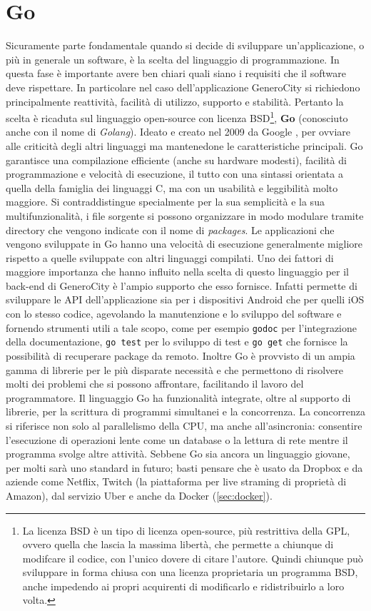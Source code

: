 \documentclass[italian, Lau, oneside, nodefaultfont, noexaminfo]{sapthesis}
\begin{document}
\section{Go}
Sicuramente parte fondamentale quando si decide di sviluppare un'applicazione, o pi\`u in generale un software, \`e la scelta del linguaggio di programmazione. In questa fase \`e importante avere ben chiari quali siano i requisiti che il software deve rispettare. In  particolare nel caso dell'applicazione GeneroCity si richiedono principalmente reattività, facilit\`a di utilizzo, supporto e stabilit\`a. Pertanto la scelta \`e ricaduta sul linguaggio  open-source con licenza BSD\footnote{ La licenza BSD \`e un tipo di licenza open-source, pi\`u restrittiva della GPL, ovvero quella che lascia la massima libert\`a, che permette a chiunque di modifcare il codice, con l'unico dovere di citare l'autore. Quindi chiunque pu\`o sviluppare in forma chiusa con una licenza proprietaria un programma BSD, anche impedendo ai propri acquirenti di modificarlo e ridistribuirlo a loro volta.}, \textbf{Go} (conosciuto anche con il nome di \textit{Golang}). Ideato e  creato nel 2009 da Google \cite{ref:Golang}, per ovviare alle criticit\`a degli altri linguaggi ma mantenedone le caratteristiche principali. Go garantisce una compilazione efficiente (anche su hardware modesti),  facilit\`a di programmazione e velocit\`a di esecuzione, il tutto con una sintassi orientata a quella della famiglia dei linguaggi C, ma con un usabilit\`a e leggibilit\`a molto maggiore. Si contraddistingue specialmente per la sua semplicit\`a e la sua multifunzionalit\`a, i file sorgente si possono organizzare in modo modulare tramite directory che vengono indicate con il nome di \textit{packages}. 
Le applicazioni che vengono sviluppate in Go hanno una velocit\`a di esecuzione generalmente migliore rispetto a quelle sviluppate con altri linguaggi compilati.
Uno dei fattori di maggiore importanza che hanno influito nella scelta di questo linguaggio per il back-end di GeneroCity  \`e l'ampio supporto che esso fornisce. Infatti permette di sviluppare le API dell'applicazione sia per i dispositivi Android che per quelli iOS con lo stesso codice, agevolando la manutenzione e lo sviluppo del software e fornendo strumenti utili a tale scopo, come per esempio \texttt{godoc} per l'integrazione della documentazione, \texttt{go test} per lo sviluppo di test e \texttt{go get} che fornisce la possibilit\`a di recuperare package da remoto. Inoltre Go è provvisto di un ampia gamma di librerie per le più disparate necessit\`a e che permettono di risolvere molti dei problemi che si possono affrontare, facilitando il lavoro del programmatore. Il linguaggio Go ha funzionalit\`a integrate, oltre al supporto di librerie, per la scrittura di programmi simultanei e la concorrenza. La concorrenza si riferisce non solo al parallelismo della CPU, ma anche all'asincronia: consentire l'esecuzione di operazioni lente come un database o la lettura di rete mentre il programma svolge altre attivit\`a. Sebbene Go sia ancora un linguaggio giovane, per molti sar\`a uno standard in futuro; basti pensare che \`e usato da Dropbox e da aziende come Netflix, Twitch (la piattaforma per live straming di propriet\`a di Amazon),  dal servizio Uber e anche da Docker (\autoref{sec:docker}).
\end{document}

